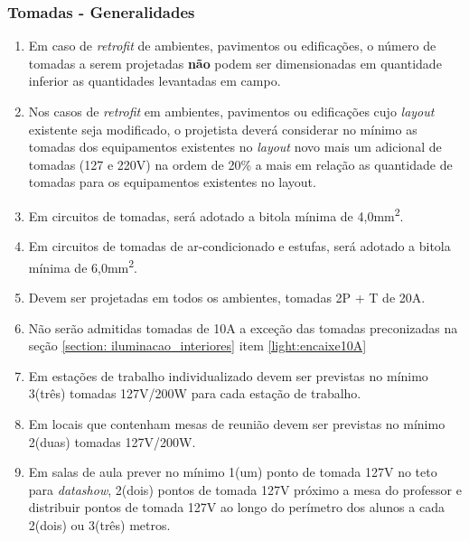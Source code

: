 \subsubsection{Tomadas - Generalidades}\label{section: socket-general}

\begin{enumerate}
		
	\item Em caso de \textit{retrofit} de ambientes, pavimentos ou edificações, o número de tomadas a serem projetadas \textbf{não} podem ser dimensionadas em quantidade inferior as quantidades levantadas em campo.
	
	\item Nos casos de \textit{retrofit} em ambientes, pavimentos ou edificações cujo \textit{layout} existente seja modificado, o projetista deverá considerar no mínimo as tomadas dos equipamentos existentes no \textit{layout} novo mais um adicional de tomadas (127 e 220V) na ordem de 20\% a mais em relação as quantidade de tomadas para os equipamentos existentes no layout.
	
	\item \label{socket: bitola minima} Em circuitos de tomadas, será adotado a bitola mínima de 4,0mm\textsuperscript{2}.
	
	\item \label{socket: bitola minima ar} Em circuitos de tomadas de ar-condicionado e estufas, será adotado a bitola mínima de 6,0mm\textsuperscript{2}.

	\item Devem ser projetadas em todos os ambientes, tomadas 2P + T de 20A.
	
	\item Não serão admitidas tomadas de 10A a exceção das tomadas preconizadas na seção \ref*{section: iluminacao_interiores} item \ref*{light:encaixe10A}
	
	\item Em estações de trabalho individualizado devem ser previstas no mínimo 3(três) tomadas 127V/200W para cada estação de trabalho.
	
	\item Em locais que contenham mesas de reunião devem ser previstas no mínimo 2(duas) tomadas 127V/200W.
	
	\item Em salas de aula prever no mínimo 1(um) ponto de tomada 127V no teto para \textit{datashow}, 2(dois) pontos de tomada 127V próximo a mesa do professor e distribuir pontos de tomada 127V ao longo do perímetro dos alunos a cada 2(dois) ou 3(três) metros.
	

\end{enumerate}
